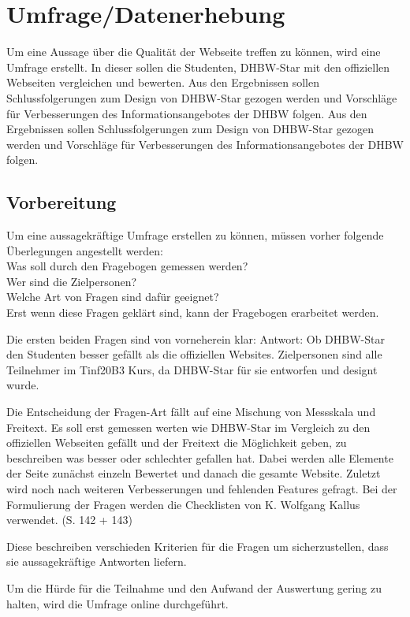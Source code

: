 \chapter{Umfrage/Datenerhebung}
Um eine Aussage über die Qualität der Webseite treffen zu können, wird eine Umfrage erstellt. In dieser sollen die Studenten, DHBW-Star mit den offiziellen Webseiten vergleichen und bewerten. Aus den Ergebnissen sollen Schlussfolgerungen zum Design von DHBW-Star gezogen werden und Vorschläge für Verbesserungen des Informationsangebotes der DHBW folgen.
Aus den Ergebnissen sollen Schlussfolgerungen zum Design von DHBW-Star gezogen werden und Vorschläge für Verbesserungen des Informationsangebotes der DHBW folgen.

\section{Vorbereitung}
Um eine aussagekräftige Umfrage erstellen zu können, müssen vorher folgende Überlegungen angestellt werden: \\
Was soll durch den Fragebogen gemessen werden? \\
Wer sind die Zielpersonen? \\
Welche Art von Fragen sind dafür geeignet? \\
Erst wenn diese Fragen geklärt sind, kann der Fragebogen erarbeitet werden.

Die ersten beiden Fragen sind von vorneherein klar:
Antwort: Ob DHBW-Star den Studenten besser gefällt als die offiziellen Websites.
Zielpersonen sind alle Teilnehmer im Tinf20B3 Kurs, da DHBW-Star für sie entworfen und designt wurde.

Die Entscheidung der Fragen-Art fällt auf eine Mischung von Messskala und Freitext. Es soll erst gemessen werten wie DHBW-Star im Vergleich zu den offiziellen Webseiten gefällt und der Freitext die Möglichkeit geben, zu beschreiben was besser oder schlechter gefallen hat.
Dabei werden alle Elemente der Seite zunächst einzeln Bewertet und danach die gesamte Website.
Zuletzt wird noch nach weiteren Verbesserungen und fehlenden Features gefragt.
Bei der Formulierung der Fragen werden die Checklisten von K. Wolfgang Kallus verwendet.
\cite{fragebogenKallus}(S. 142 + 143)

Diese beschreiben verschieden Kriterien für die Fragen um sicherzustellen, dass sie aussagekräftige Antworten liefern.

Um die Hürde für die Teilnahme und den Aufwand der Auswertung gering zu halten, wird die Umfrage online durchgeführt.

